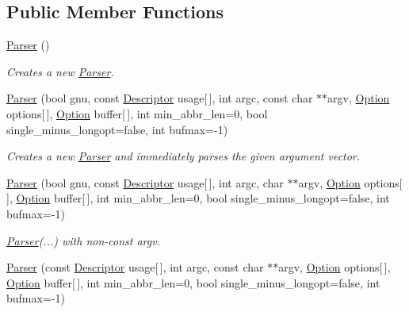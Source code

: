 \subsection*{Public Member Functions}
\begin{DoxyCompactItemize}
\item 
\hyperlink{classoption_1_1Parser_a895e9a1db19f1a026ee6a7412de17d04}{Parser} ()\hypertarget{classoption_1_1Parser_a895e9a1db19f1a026ee6a7412de17d04}{}\label{classoption_1_1Parser_a895e9a1db19f1a026ee6a7412de17d04}

\begin{DoxyCompactList}\small\item\em Creates a new \hyperlink{classoption_1_1Parser}{Parser}. \end{DoxyCompactList}\item 
\hyperlink{classoption_1_1Parser_aa747e9792c9c08ede32b6c323438db71}{Parser} (bool gnu, const \hyperlink{structoption_1_1Descriptor}{Descriptor} usage\mbox{[}$\,$\mbox{]}, int argc, const char $\ast$$\ast$argv, \hyperlink{classoption_1_1Option}{Option} options\mbox{[}$\,$\mbox{]}, \hyperlink{classoption_1_1Option}{Option} buffer\mbox{[}$\,$\mbox{]}, int min\+\_\+abbr\+\_\+len=0, bool single\+\_\+minus\+\_\+longopt=false, int bufmax=-\/1)
\begin{DoxyCompactList}\small\item\em Creates a new \hyperlink{classoption_1_1Parser}{Parser} and immediately parses the given argument vector. \end{DoxyCompactList}\item 
\hyperlink{classoption_1_1Parser_a78b4c7d73fff17204dd908b1b167dec9}{Parser} (bool gnu, const \hyperlink{structoption_1_1Descriptor}{Descriptor} usage\mbox{[}$\,$\mbox{]}, int argc, char $\ast$$\ast$argv, \hyperlink{classoption_1_1Option}{Option} options\mbox{[}$\,$\mbox{]}, \hyperlink{classoption_1_1Option}{Option} buffer\mbox{[}$\,$\mbox{]}, int min\+\_\+abbr\+\_\+len=0, bool single\+\_\+minus\+\_\+longopt=false, int bufmax=-\/1)\hypertarget{classoption_1_1Parser_a78b4c7d73fff17204dd908b1b167dec9}{}\label{classoption_1_1Parser_a78b4c7d73fff17204dd908b1b167dec9}

\begin{DoxyCompactList}\small\item\em \hyperlink{classoption_1_1Parser}{Parser}(...) with non-\/const argv. \end{DoxyCompactList}\item 
\hyperlink{classoption_1_1Parser_ae4100da4b662937ead22484e6cfc7cec}{Parser} (const \hyperlink{structoption_1_1Descriptor}{Descriptor} usage\mbox{[}$\,$\mbox{]}, int argc, const char $\ast$$\ast$argv, \hyperlink{classoption_1_1Option}{Option} options\mbox{[}$\,$\mbox{]}, \hyperlink{classoption_1_1Option}{Option} buffer\mbox{[}$\,$\mbox{]}, int min\+\_\+abbr\+\_\+len=0, bool single\+\_\+minus\+\_\+longopt=false, int bufmax=-\/1)\hypertarget{classoption_1_1Parser_ae4100da4b662937ead22484e6cfc7cec}{}\label{classoption_1_1Parser_ae4100da4b662937ead22484e6cfc7cec}


\end{DoxyCompactItemize}
